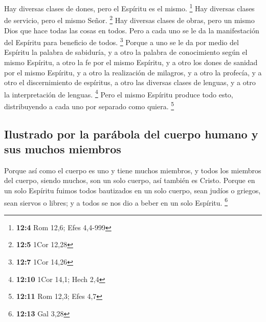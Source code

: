  Hay diversas clases de dones, pero el Espíritu es el
mismo. \footnote{\textbf{12:4} Rom 12,6; Efes 4,4-999} 
Hay diversas clases de servicio, pero el mismo Señor. \footnote{\textbf{12:5}
  1Cor 12,28}  Hay diversas clases de obras, pero un mismo
Dios que hace todas las cosas en todos.  Pero a cada uno
se le da la manifestación del Espíritu para beneficio de todos.
\footnote{\textbf{12:7} 1Cor 14,26}  Porque a uno se le da
por medio del Espíritu la palabra de sabiduría, y a otro la palabra de
conocimiento según el mismo Espíritu,  a otro la fe por el
mismo Espíritu, y a otro los dones de sanidad por el mismo Espíritu,
 y a otro la realización de milagros, y a otro la
profecía, y a otro el discernimiento de espíritus, a otro las diversas
clases de lenguas, y a otro la interpretación de lenguas. \footnote{\textbf{12:10}
  1Cor 14,1; Hech 2,4}  Pero el mismo Espíritu produce
todo esto, distribuyendo a cada uno por separado como quiera.
\footnote{\textbf{12:11} Rom 12,3; Efes 4,7}

\hypertarget{ilustrado-por-la-paruxe1bola-del-cuerpo-humano-y-sus-muchos-miembros}{%
\subsection{Ilustrado por la parábola del cuerpo humano y sus muchos
miembros}\label{ilustrado-por-la-paruxe1bola-del-cuerpo-humano-y-sus-muchos-miembros}}

 Porque así como el cuerpo es uno y tiene muchos
miembros, y todos los miembros del cuerpo, siendo muchos, son un solo
cuerpo, así también es Cristo.  Porque en un solo
Espíritu fuimos todos bautizados en un solo cuerpo, sean judíos o
griegos, sean siervos o libres; y a todos se nos dio a beber en un solo
Espíritu. \footnote{\textbf{12:13} Gal 3,28}

